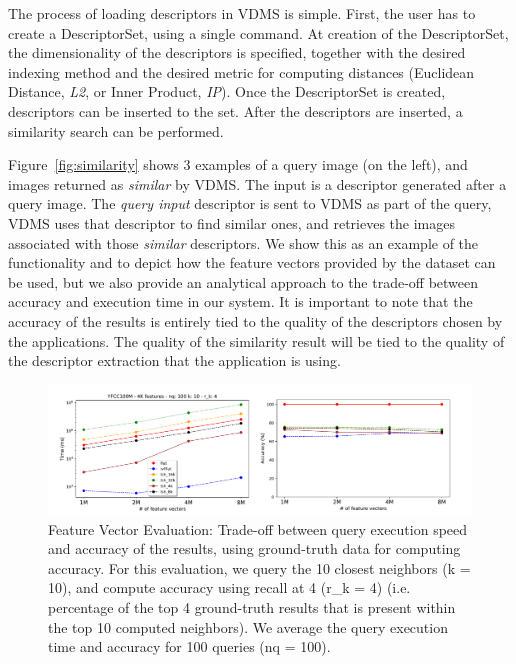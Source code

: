 The process of loading descriptors in VDMS is simple.
First, the user has to create a DescriptorSet, using a single command.
At creation of the DescriptorSet, the dimensionality of the descriptors
is specified, together with the desired indexing method and the desired metric
for computing distances (Euclidean Distance, \textit{L2},
or Inner Product, \textit{IP}).
Once the DescriptorSet is created, descriptors can be inserted to the set.
After the descriptors are inserted, a similarity search can be performed.

Figure~\ref{fig:similarity} shows 3 examples of a query image (on the left),
and images returned as \textit{similar} by VDMS.
The input is a descriptor generated after a query image.
The \textit{query input} descriptor is sent to VDMS as part of the query,
VDMS uses that descriptor to find similar ones,
and retrieves the images associated with those \textit{similar} descriptors.
We show this as an example of the functionality and to depict
how the feature vectors provided by the dataset can be used,
but we also provide an analytical approach to
the trade-off between accuracy and execution time in our system.
It is important to note that the accuracy of the results is entirely tied
to the quality of the descriptors chosen by the applications.
The quality of the similarity result will be tied to the quality
of the descriptor extraction that the application is using.

\begin{figure}[ht]
\centering
\includegraphics[width=\textwidth]{figures/features_alternatives}
\caption{Feature Vector Evaluation: Trade-off between query execution speed
and accuracy of the results, using ground-truth data for computing accuracy.
For this evaluation, we query the 10 closest neighbors (k = 10), and compute
accuracy using recall at 4 (r\_k = 4) (i.e. percentage of the top 4 ground-truth
results that is present within the top 10 computed neighbors).
We average the query execution time and accuracy for 100 queries (nq = 100).}
\label{fig:features_eval}
\end{figure}


